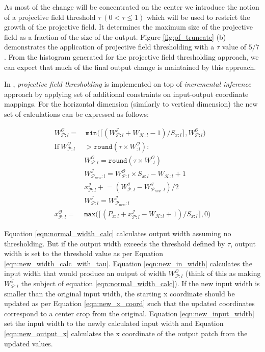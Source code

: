 As most of the change will be concentrated on the center we introduce the notion of a projective field threshold $\tau ~ (0 < \tau \leq 1)$ which will be used to restrict the growth of the projective field.
It determines the maximum size of the projective field as a fraction of the size of the output.
Figure \ref{fig:pf_truncate} (b) demonstrates the application of projective field thresholding with a $\tau$ value of $5/7$.
From the histogram generated for the projective field thresholding approach, we can expect that much of the final output change is maintained by this approach.

In \system, \textit{projective field thresholding} is implemented on top of \textit{incremental inference} approach by applying set of additional constraints on input-output coordinate mappings. For the horizontal dimension (similarly to vertical dimension) the new set of calculations can be expressed as follows:

\begin{align}
\label{eqn:normal_width_calc}
W^\mathcal{O}_{\mathcal{P}:l} = &~ \texttt{min}\big(\lceil (W^\mathcal{I}_{\mathcal{P}:l} + W_{\mathcal{K}:l} - 1)/S_{x:l} \rceil, W^\mathcal{O}_{\mathcal{P}:l}\big)\\
\label{eqn:check_tau}
\text{If}~ W_{\mathcal{P}:l}^\mathcal{O} & > \texttt{round}(\tau \times W^\mathcal{O}_{:l}):\\
\label{eqn:new_width_calc_with_tau}
& W^\mathcal{O}_{\mathcal{P}:l} = \texttt{round}(\tau \times W^\mathcal{O}_{:l})\\
\label{eqn:new_in_width}
& W^\mathcal{I}_{\mathcal{P}_{new}:l} = W^\mathcal{O}_{\mathcal{P}:l} \times S_{x:l} - W_{\mathcal{K}:l} + 1\\
\label{eqn:new_x_coord}
& x^{\mathcal{I}}_{\mathcal{P}:l} \mathrel{+}= (W^\mathcal{I}_{\mathcal{P}:l} - W^\mathcal{I}_{\mathcal{P}_{new}:l})/2\\
\label{eqn:new_input_width}
& W^\mathcal{I}_{\mathcal{P}:l} = W^\mathcal{I}_{\mathcal{P}_{new}:l}\\
\label{eqn:new_output_x}
x^\mathcal{O}_{\mathcal{P}:l} = & \texttt{max}\big(\lceil (P_{x:l} + x^\mathcal{I}_{\mathcal{P}:l} - W_{\mathcal{K}:l} + 1)/S_{x:l} \rceil, 0\big)
\end{align}

Equation \ref{eqn:normal_width_calc} calculates output width assuming no thresholding.
But if the output width exceeds the threshold defined by $\tau$, output width is set to the threshold value as per Equation \ref{eqn:new_width_calc_with_tau}.
Equation \ref{eqn:new_in_width} calculates the input width that would produce an output of width $W^\mathcal{O}_{\mathcal{P}:l}$ (think of this as making $W^{\mathcal{I}}_{\mathcal{P}:l}$ the subject of equation \ref{eqn:normal_width_calc}).
If the new input width is smaller than the original input width, the starting x coordinate should be updated as per Equation \ref{eqn:new_x_coord} such that the updated coordinates correspond to a center crop from the original.
Equation \ref{eqn:new_input_width} set the input width to the newly calculated input width and Equation \ref{eqn:new_output_x} calculates the x coordinate of the output patch from the updated values.

